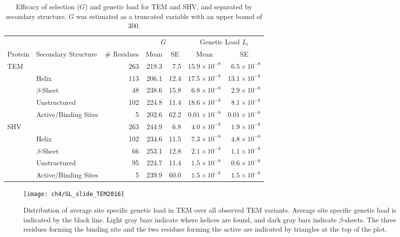 \begin{table}
  \centering
  \caption{Efficacy of selection ($G$) and genetic load for TEM and SHV, and separated by secondary structure. $G$ was estimated as a truncated variable with an upper bound of 300.}
  \begin{tabular}{llrrrrr}
    \hline
    & & & \multicolumn{2}{c}{$G$} & \multicolumn{2}{c}{Genetic Load $L_i$} \\ 
    Protein & Secondary Structure & \# Residues	& \multicolumn{1}{c}{Mean} & \multicolumn{1}{c}{SE} & \multicolumn{1}{c}{Mean} & \multicolumn{1}{c}{SE} \\ \hline 
    TEM	&		& 263 & 219.3 & 7.5  & $15.9\times10^{-8}$ & $6.5\times10^{-8}$ \\
    &Helix 		& 113 & 206.1 & 12.4 & $17.5\times10^{-8}$ & $13.1\times10^{-8}$ \\
    &$\beta$-Sheet 	&  48 & 238.6 & 15.8 & $ 6.8\times10^{-8}$ & $2.9\times10^{-8}$ \\
    &Unstructured 	& 102 & 224.8 & 11.4 & $18.6\times10^{-8}$ & $8.1\times10^{-8}$ \\
    &Active/Binding Sites 	&   5 & 202.6 & 62.2 & $0.01\times10^{-8}$& $0.01\times10^{-8}$ \\ \hline
    
    SHV&		& 263 & 244.9 & 6.8  & $4.0\times10^{-8}$ & $1.9\times10^{-8}$ \\
    &Helix		& 102 & 234.6 & 11.5 & $7.3\times10^{-8}$ & $4.8\times10^{-8}$ \\
    &$\beta$-Sheet 	&  66 & 253.1 & 12.8 & $2.1\times10^{-8}$ & $1.1\times10^{-8}$ \\
    &Unstructured	&  95 & 224.7 & 11.4 & $1.5\times10^{-8}$ & $0.6\times10^{-8}$  \\
    &Active/Binding Sites	&   5 & 239.9 & 60.0 & $1.5\times10^{-8}$ & $1.5\times10^{-8}$ \\ \hline
  \end{tabular}
  \label{tab:selection}
\end{table}


\singlespacing
\begin{figure}
     \centering
	\texttt{[image: ch4/GL\_slide\_TEM2016]}
	\caption{Distribution of average site specific genetic load in TEM over all observed TEM variants. 
	Average site specific genetic load is indicated by the black line. 
	Light gray bars indicate where helices are found, and dark gray bars indicate $\beta$-sheets.
	The three residues forming the binding site and the two residues forming the active are indicated by triangles at the top of the plot.}
	\label{fig:tem2016_sse}
\end{figure}
\doublespacing

